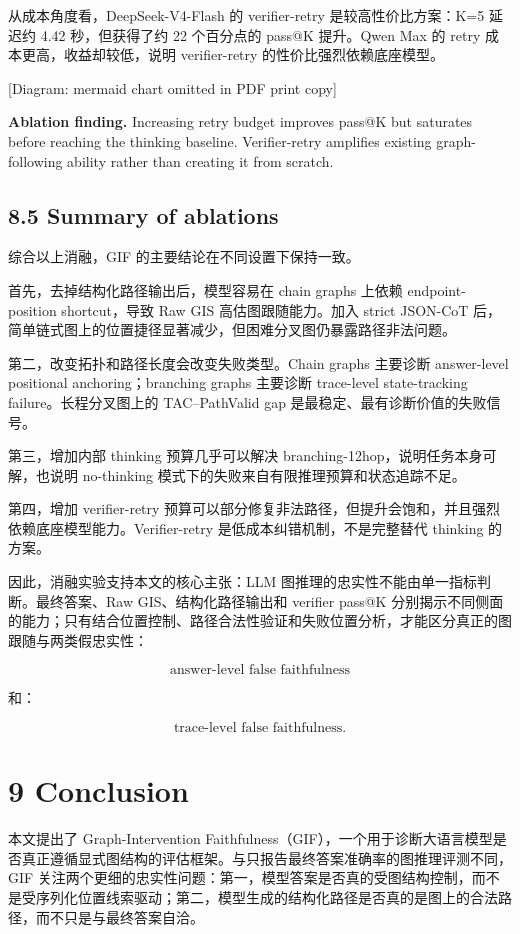 \documentclass[
  11pt,
]{article}
\begin{document}
从成本角度看，DeepSeek-V4-Flash 的 verifier-retry 是较高性价比方案：K=5
延迟约 4.42 秒，但获得了约 22 个百分点的 pass@K 提升。Qwen Max 的 retry
成本更高，收益却较低，说明 verifier-retry 的性价比强烈依赖底座模型。

{[}Diagram: mermaid chart omitted in PDF print copy{]}

\textbf{Ablation finding.} Increasing retry budget improves pass@K but
saturates before reaching the thinking baseline. Verifier-retry
amplifies existing graph-following ability rather than creating it from
scratch.

\subsection{8.5 Summary of ablations}\label{summary-of-ablations}

综合以上消融，GIF 的主要结论在不同设置下保持一致。

首先，去掉结构化路径输出后，模型容易在 chain graphs 上依赖
endpoint-position shortcut，导致 Raw GIS 高估图跟随能力。加入 strict
JSON-CoT
后，简单链式图上的位置捷径显著减少，但困难分叉图仍暴露路径非法问题。

第二，改变拓扑和路径长度会改变失败类型。Chain graphs 主要诊断
answer-level positional anchoring；branching graphs 主要诊断 trace-level
state-tracking failure。长程分叉图上的 TAC--PathValid gap
是最稳定、最有诊断价值的失败信号。

第三，增加内部 thinking 预算几乎可以解决
branching-12hop，说明任务本身可解，也说明 no-thinking
模式下的失败来自有限推理预算和状态追踪不足。

第四，增加 verifier-retry
预算可以部分修复非法路径，但提升会饱和，并且强烈依赖底座模型能力。Verifier-retry
是低成本纠错机制，不是完整替代 thinking 的方案。

因此，消融实验支持本文的核心主张：LLM
图推理的忠实性不能由单一指标判断。最终答案、Raw GIS、结构化路径输出和
verifier pass@K
分别揭示不同侧面的能力；只有结合位置控制、路径合法性验证和失败位置分析，才能区分真正的图跟随与两类假忠实性：

\[
\text{answer-level false faithfulness}  
\]

和：

\[
\text{trace-level false faithfulness}.  
\]

\section{9 Conclusion}\label{conclusion}

本文提出了 Graph-Intervention
Faithfulness（GIF），一个用于诊断大语言模型是否真正遵循显式图结构的评估框架。与只报告最终答案准确率的图推理评测不同，GIF
关注两个更细的忠实性问题：第一，模型答案是否真的受图结构控制，而不是受序列化位置线索驱动；第二，模型生成的结构化路径是否真的是图上的合法路径，而不只是与最终答案自洽。
\end{document}
